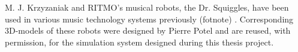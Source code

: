 



M. J. Krzyzaniak and RITMO's musical robots, the Dr. Squiggles, have been used in various music technology systems previously (fotnote) \cite{dr_squiggles}. Corresponding 3D-models of these robots were designed by Pierre Potel \cite{pierre_potel} and are reused, with permission, for the simulation system designed during this thesis project.

